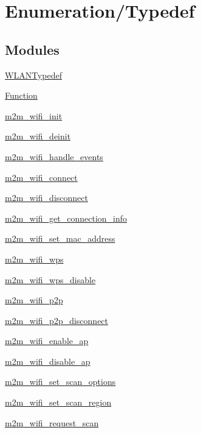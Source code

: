 \hypertarget{group__WlanEnums}{}\section{Enumeration/\+Typedef}
\label{group__WlanEnums}
\subsection*{Modules}
\begin{DoxyCompactItemize}
\item 
\hyperlink{group__OTATYPEDEF}{W\+L\+A\+N\+Typedef}
\item 
\hyperlink{group__WLANAPI}{Function}
\item 
\hyperlink{group__WifiInitFn}{m2m\+\_\+wifi\+\_\+init}
\item 
\hyperlink{group__WifiDeinitFn}{m2m\+\_\+wifi\+\_\+deinit}
\item 
\hyperlink{group__WifiHandleEventsFn}{m2m\+\_\+wifi\+\_\+handle\+\_\+events}
\item 
\hyperlink{group__WifiConnectFn}{m2m\+\_\+wifi\+\_\+connect}
\item 
\hyperlink{group__WifiDisconnectFn}{m2m\+\_\+wifi\+\_\+disconnect}
\item 
\hyperlink{group__GetConnectionInfoFn}{m2m\+\_\+wifi\+\_\+get\+\_\+connection\+\_\+info}
\item 
\hyperlink{group__WifiSetMacAddFn}{m2m\+\_\+wifi\+\_\+set\+\_\+mac\+\_\+address}
\item 
\hyperlink{group__WifiWpsFn}{m2m\+\_\+wifi\+\_\+wps}
\item 
\hyperlink{group__WifiWpsDisableFn}{m2m\+\_\+wifi\+\_\+wps\+\_\+disable}
\item 
\hyperlink{group__WifiP2PFn}{m2m\+\_\+wifi\+\_\+p2p}
\item 
\hyperlink{group__WifiP2PDisconnectFn}{m2m\+\_\+wifi\+\_\+p2p\+\_\+disconnect}
\item 
\hyperlink{group__WifiEnableApFn}{m2m\+\_\+wifi\+\_\+enable\+\_\+ap}
\item 
\hyperlink{group__WifiDisableApFn}{m2m\+\_\+wifi\+\_\+disable\+\_\+ap}
\item 
\hyperlink{group__WifiSetScanOptionFn}{m2m\+\_\+wifi\+\_\+set\+\_\+scan\+\_\+options}
\item 
\hyperlink{group__WifiSetScanRegionFn}{m2m\+\_\+wifi\+\_\+set\+\_\+scan\+\_\+region}
\item 
\hyperlink{group__WifiRequestScanFn}{m2m\+\_\+wifi\+\_\+request\+\_\+scan}

\end{DoxyCompactItemize}
